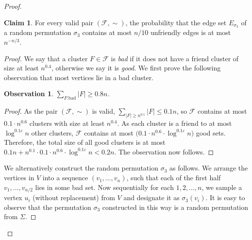 \documentclass[11pt]{article}
\newtheorem{observation}[theorem]{Observation}
\theoremstyle{definition}
\newtheorem{claim}[theorem]{Claim}
\newcommand{\fset}{{\mathcal{F}}}
\newcommand{\eps}{{\varepsilon}}
\begin{document}
\begin{titlepage}
\begin{proof}
\begin{claim}
\label{clm: number of permutation}
For every valid pair $(\fset,\sim)$, the probability that the edge set $E_{\sigma_3}$ of a random permutation $\sigma_3$ contains at most $n/10$ unfriendly edges is at most $n^{-n/3}$.
\end{claim}
\begin{proof}
We say that a cluster $F\in \fset$ is \emph{bad} if it does not have a friend cluster of size at least $n^{0.4}$, otherwise we say it is \emph{good}. We first prove the following observation that most vertices lie in a bad cluster.

\begin{observation}
$\sum_{F\text{:bad}}|F|\ge 0.8n$.
\end{observation}
\begin{proof}
As the pair $(\fset,\sim)$ is valid, $\sum_{|F|\ge n^{0.1}}|F|\le 0.1n$, so $\fset$ contains at most $0.1\cdot n^{0.6}$ clusters with size at least $n^{0.4}$. 
As each cluster is a friend to at most $\log^{0.1\eps} n$ other clusters, $\fset$ contains at most $\big(0.1\cdot n^{0.6}\cdot\log^{0.1\eps}n\big)$ good sets. Therefore, the total size of all good clusters is at most $0.1n + n^{0.1} \cdot 0.1 \cdot n^{0.6}\cdot\log^{0.1\eps}n < 0.2n$. The observation now follows.
\end{proof}


We alternatively construct the random permutation $\sigma_3$ as follows. We arrange the vertices in $V$ into a sequence $(v_1,\ldots,v_n)$, such that each of the first half $v_1,\ldots,v_{n/2}$ lies in some bad set. Now sequentially for each $1,2,\ldots,n$, we sample a vertex $u_i$ (without replacement) from $V$ and designate it as $\sigma_3(v_i)$. It is easy to observe that the permutation $\sigma_3$ constructed in this way is a random permutation from $\Sigma$.


\end{proof}
\end{proof}
\end{titlepage}
\end{document}
